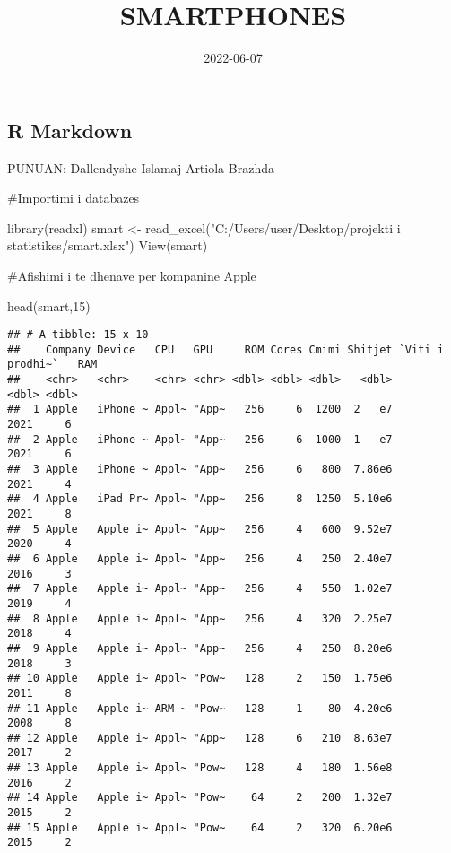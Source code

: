 \documentclass[
]{article}
\title{SMARTPHONES}
\author{}
\date{\vspace{-2.5em}2022-06-07}
\newenvironment{Shaded}{\begin{snugshade}}{\end{snugshade}}
\newcommand{\DecValTok}[1]{\textcolor[rgb]{0.00,0.00,0.81}{#1}}
\newcommand{\FunctionTok}[1]{\textcolor[rgb]{0.00,0.00,0.00}{#1}}
\newcommand{\NormalTok}[1]{#1}
\newcommand{\OtherTok}[1]{\textcolor[rgb]{0.56,0.35,0.01}{#1}}
\newcommand{\StringTok}[1]{\textcolor[rgb]{0.31,0.60,0.02}{#1}}
\begin{document}
\maketitle

\hypertarget{r-markdown}{%
\subsection{R Markdown}\label{r-markdown}}

PUNUAN: Dallendyshe Islamaj Artiola Brazhda

\#Importimi i databazes

\begin{Shaded}
\begin{Highlighting}[]
\FunctionTok{library}\NormalTok{(readxl)}
\NormalTok{smart }\OtherTok{\textless{}{-}} \FunctionTok{read\_excel}\NormalTok{(}\StringTok{"C:/Users/user/Desktop/projekti i statistikes/smart.xlsx"}\NormalTok{)}
\FunctionTok{View}\NormalTok{(smart)}
\end{Highlighting}
\end{Shaded}

\#Afishimi i te dhenave per kompanine Apple

\begin{Shaded}
\begin{Highlighting}[]
\FunctionTok{head}\NormalTok{(smart,}\DecValTok{15}\NormalTok{)}
\end{Highlighting}
\end{Shaded}

\begin{verbatim}
## # A tibble: 15 x 10
##    Company Device   CPU   GPU     ROM Cores Cmimi Shitjet `Viti i prodhi~`   RAM
##    <chr>   <chr>    <chr> <chr> <dbl> <dbl> <dbl>   <dbl>            <dbl> <dbl>
##  1 Apple   iPhone ~ Appl~ "App~   256     6  1200  2   e7             2021     6
##  2 Apple   iPhone ~ Appl~ "App~   256     6  1000  1   e7             2021     6
##  3 Apple   iPhone ~ Appl~ "App~   256     6   800  7.86e6             2021     4
##  4 Apple   iPad Pr~ Appl~ "App~   256     8  1250  5.10e6             2021     8
##  5 Apple   Apple i~ Appl~ "App~   256     4   600  9.52e7             2020     4
##  6 Apple   Apple i~ Appl~ "App~   256     4   250  2.40e7             2016     3
##  7 Apple   Apple i~ Appl~ "App~   256     4   550  1.02e7             2019     4
##  8 Apple   Apple i~ Appl~ "App~   256     4   320  2.25e7             2018     4
##  9 Apple   Apple i~ Appl~ "App~   256     4   250  8.20e6             2018     3
## 10 Apple   Apple i~ Appl~ "Pow~   128     2   150  1.75e6             2011     8
## 11 Apple   Apple i~ ARM ~ "Pow~   128     1    80  4.20e6             2008     8
## 12 Apple   Apple i~ Appl~ "App~   128     6   210  8.63e7             2017     2
## 13 Apple   Apple i~ Appl~ "Pow~   128     4   180  1.56e8             2016     2
## 14 Apple   Apple i~ Appl~ "Pow~    64     2   200  1.32e7             2015     2
## 15 Apple   Apple i~ Appl~ "Pow~    64     2   320  6.20e6             2015     2
\end{verbatim}
\end{document}
